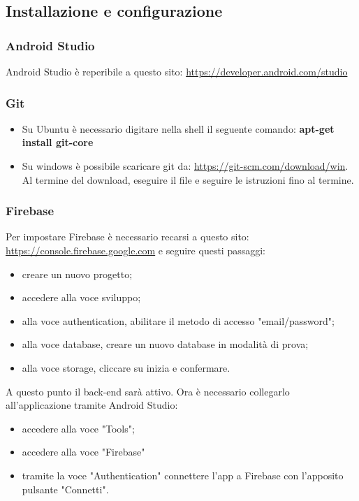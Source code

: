 \subsection{Installazione e configurazione}
\subsubsection{Android Studio} 
Android Studio è reperibile a questo sito: \url{https://developer.android.com/studio}
\subsubsection{Git}
\begin{itemize}
	\item Su Ubuntu è necessario digitare nella shell il seguente comando: \textbf{apt-get install git-core}
	\item Su windows è possibile scaricare git da: \url{https://git-scm.com/download/win}.
	Al termine del download, eseguire il file e seguire le istruzioni fino al termine.
\end{itemize}
\subsubsection{Firebase}
Per impostare Firebase è necessario recarsi a questo sito: \url{https://console.firebase.google.com} e seguire questi passaggi:
\begin{itemize}
	\item creare un nuovo progetto;
	\item accedere alla voce sviluppo;
	\item alla voce authentication, abilitare il metodo di accesso "email/password";
	\item alla voce database, creare un nuovo database in modalità di prova;
	\item alla voce storage, cliccare su inizia e confermare.
\end{itemize}
A questo punto il back-end sarà attivo. Ora è necessario collegarlo all'applicazione tramite Android Studio:
\begin{itemize}
	\item accedere alla voce "Tools";
	\item accedere alla voce "Firebase"
	\item tramite la voce "Authentication" connettere l'app a Firebase con l'apposito pulsante "Connetti".
\end{itemize}
 

